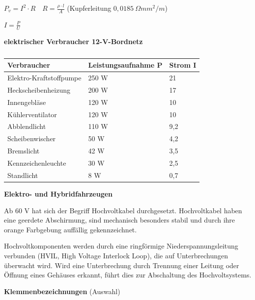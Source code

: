 $P_v = I^2 \cdot R \quad R = \frac{\rho \cdot l}{A}$ (Kupferleitung
$0,0185~\Omega mm^2/m$)

$I = \frac{P}{U}$

\newpage

\textbf{elektrischer Verbraucher 12-V-Bordnetz}

\begin{table}[!ht]%
\centering 
	\caption{}%
\begin{tabular}{@{}lll@{}}
\hline
\textbf{Verbraucher} & \textbf{Leistungsaufnahme P} & \textbf{Strom
I} \\
\hline
Elektro-Kraftstoffpumpe & 250 W & 21 \\
Heckscheibenheizung & 200 W & 17 \\
Innengebläse & 120 W & 10 \\
Kühlerventilator & 120 W & 10 \\
Abblendlicht & 110 W & 9,2 \\
Scheibenwischer & 50 W & 4,2 \\
Bremslicht & 42 W & 3,5 \\
Kennzeichenleuchte & 30 W & 2,5 \\
Standlicht & 8 W & 0,7 \\
\hline
\end{tabular} 
\end{table}

\textbf{Elektro- und Hybridfahrzeugen}

Ab 60 V hat sich der Begriff Hochvoltkabel durchgesetzt. Hochvoltkabel
haben eine geerdete Abschirmung, sind mechanisch besonders stabil und
durch ihre orange Farbgebung auffällig gekennzeichnet.

Hochvoltkomponenten werden durch eine ringförmige Niederspannungsleitung
verbunden (HVIL, High Voltage Interlock Loop), die auf Unterbrechungen
überwacht wird. Wird eine Unterbrechung durch Trennung einer Leitung
oder Öffnung eines Gehäuses erkannt, führt dies zur Abschaltung des
Hochvoltsystems.

\textbf{Klemmenbezeichnungen} (Auswahl)

